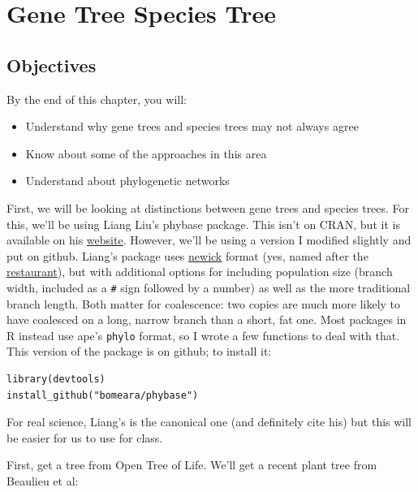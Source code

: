 \documentclass[]{article}
\providecommand{\tightlist}{%
  \setlength{\itemsep}{0pt}\setlength{\parskip}{0pt}}
\theoremstyle{definition}
\theoremstyle{definition}
\theoremstyle{definition}
\theoremstyle{remark}
\begin{document}
\hypertarget{gene-tree-species-tree}{%
\section{Gene Tree Species Tree}\label{gene-tree-species-tree}}

\hypertarget{objectives-7}{%
\subsection{Objectives}\label{objectives-7}}

By the end of this chapter, you will:

\begin{itemize}
\tightlist
\item
  Understand why gene trees and species trees may not always agree
\item
  Know about some of the approaches in this area
\item
  Understand about phylogenetic networks
\end{itemize}

First, we will be looking at distinctions between gene trees and species
trees. For this, we'll be using Liang Liu's phybase package. This isn't
on CRAN, but it is available on his
\href{https://faculty.franklin.uga.edu/lliu/content/phybase?}{website}.
However, we'll be using a version I modified slightly and put on github.
Liang's package uses
\href{http://evolution.genetics.washington.edu/phylip/newicktree.html}{newick}
format (yes, named after the \href{http://newicks.com}{restaurant}), but
with additional options for including population size (branch width,
included as a \texttt{\#} sign followed by a number) as well as the more
traditional branch length. Both matter for coalescence: two copies are
much more likely to have coalesced on a long, narrow branch than a
short, fat one. Most packages in R instead use ape's \texttt{phylo}
format, so I wrote a few functions to deal with that. This version of
the package is on github; to install it:

\begin{verbatim}
library(devtools)
install_github("bomeara/phybase")
\end{verbatim}

For real science, Liang's is the canonical one (and definitely cite his)
but this will be easier for us to use for class.

First, get a tree from Open Tree of Life. We'll get a recent plant tree
from Beaulieu et al:
\end{document}
